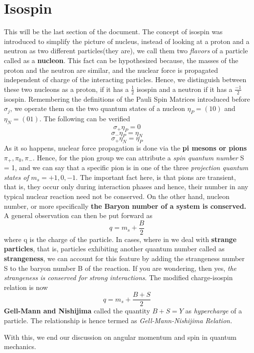 \documentclass[12pt]{article}
\begin{document}
\section{Isospin}
This will be the last section of the document. The concept of isospin was introduced to simplify the picture of nucleus, instead of looking at a proton and a neutron as two different particles(they are), we call them two \textit{flavors} of a particle called as a \textbf{nucleon}. 
This fact can be hypothesized because, the masses of the proton and the neutron are similar, and the nuclear force is propagated independent of charge of the interacting particles. Hence, we distinguish between these two nucleons as a proton, if it has a $\frac{1}{2}$ isospin and a neutron if it has a $\frac{-1}{2}$ isospin. Remembering the definitions of the Pauli Spin Matrices introduced before $\sigma_j$, we operate them on the two quantum states of a nucleon $\eta_P = (1   0)$ and $\eta_N = (0   1)$. The following can be verified $$\sigma_{+}\eta_P = 0$$
$$\sigma_-\eta_P = \eta_N$$
$$\sigma_+\eta_N = \eta_P$$
As it so happens, nuclear force propagation is done via the \textbf{pi mesons or pions} $\pi_+, \pi_0, \pi_-$. Hence, for the pion group we can attribute a \textit{spin quantum number} S = 1, and we can say that a specific pion is in one of the three \textit{projection quantum states of} $m_s = +1,0,-1$. The important fact here, is that pions are transient, that is, they occur only during interaction phases and hence, their number in any typical nuclear reaction need not be conserved. On the other hand, nucleon number, or more specifically \textbf{the Baryon number of a system is conserved.} A general observation can then be put forward as $$q = m_s + \frac{B}{2}$$
where q is the charge of the particle. In cases, where in we deal with \textbf{strange particles}, that is, particles exhibiting another quantum number called as \textbf{strangeness}, we can account for this feature by adding the strangeness number S to the baryon number B of the reaction. If you are wondering, then yes, \textit{the strangeness is conserved for strong interactions}. The modified charge-isospin relation is now 
$$q = m_s + \frac{B+S}{2}$$
\textbf{Gell-Mann and Nishijima} called the quantity $B+S = Y$ as \textit{hypercharge} of a particle. The relationship is hence termed as \textit{Gell-Mann-Nishijima Relation.} 

With this, we end our discussion on angular momentum and spin in quantum mechanics.


\end{document}
